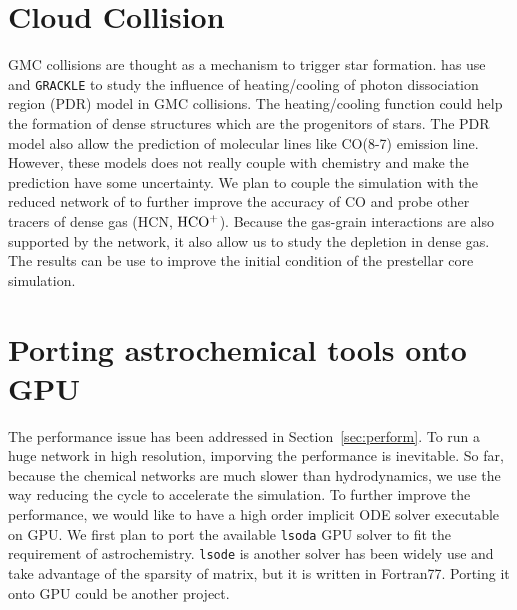 \section{Cloud Collision}
GMC collisions are thought as a mechanism to trigger star formation. \Cite[]{Wu2015, Wu2017} has use {\ENZO} and {\tt GRACKLE} to study the influence of heating/cooling of photon dissociation region (PDR) model in GMC collisions. The heating/cooling function could help the formation of dense structures which are the progenitors of stars. The PDR model also allow the prediction of molecular lines like CO(8-7) emission line. However, these models does not really couple with chemistry and make the prediction have some uncertainty. We plan to couple the simulation with the reduced network of {\UCLCHEM} to further improve the accuracy of CO and probe other tracers of dense gas (HCN, $\rm HCO^+$). Because the gas-grain interactions are also supported by the network, it also allow us to study the depletion in dense gas. The results can be use to improve the initial condition of the prestellar core simulation.

\section{Porting astrochemical tools onto GPU}
The performance issue has been addressed in Section~\ref{sec:perform}. To run a huge network in high resolution, imporving the performance is inevitable. So far, because the chemical networks are much slower than hydrodynamics, we use the way reducing the cycle to accelerate the simulation. To further improve the performance, we would like to have a high order implicit ODE solver executable on GPU. We first plan to port the available {\tt lsoda} GPU solver to fit the requirement of astrochemistry. {\tt lsode} is another solver has been widely use and take advantage of the sparsity of matrix, but it is written in Fortran77. Porting it onto GPU could be another project. 

